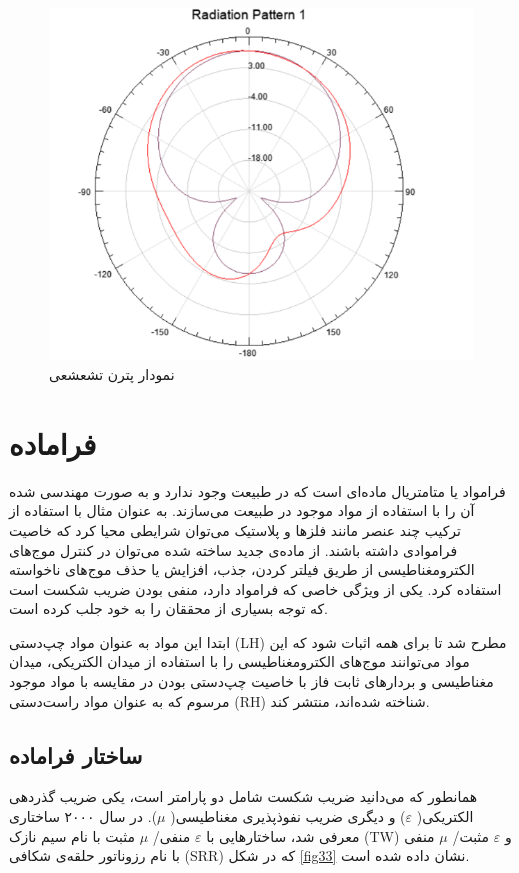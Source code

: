 \begin{figure}
	\centering
	\includegraphics[scale=0.5]{Images/fig32.png}
	\caption{نمودار پترن تشعشعی}
	\label{fig32}
\end{figure}
 
 
\section{فراماده}
 فرامواد یا متامتریال
  ماده‌ای است که در طبیعت وجود ندارد و به صورت مهندسی شده آن را با استفاده از مواد موجود در طبیعت می‌سازند. به عنوان مثال با استفاده از ترکیب چند عنصر مانند فلزها و پلاستیک می‌توان شرایطی محیا کرد که خاصیت فراموادی داشته باشند. از ماده‌ی جدید ساخته شده می‌توان در کنترل موج‌های الکترومغناطیسی از طریق فیلتر کردن، جذب، افزایش یا حذف موج‌های ناخواسته استفاده کرد. یکی از ویژگی خاصی که فرامواد دارد، منفی بودن ضریب شکست است که توجه بسیاری از محققان را به خود جلب کرده است. 
  
  
  ابتدا این مواد به عنوان مواد چپ‌دستی (LH) مطرح شد تا برای همه اثبات شود که این مواد می‌توانند موج‌های الکترومغناطیسی را با استفاده از میدان الکتریکی، میدان مغناطیسی و بردارهای ثابت فاز با خاصیت‌ چپ‌دستی بودن در مقایسه با مواد موجود مرسوم که به عنوان مواد راست‌دستی (RH) شناخته شده‌اند، منتشر کند.
  
  
\subsection{ساختار فراماده}
 
 همانطور که می‌دانید ضریب شکست شامل دو پارامتر است، یکی ضریب گذردهی الکتریکی(
 $\varepsilon$)
  و دیگری ضریب نفوذ‌پذیری مغناطیسی(
  $\mu$).
   در سال ۲۰۰۰ ساختاری معرفی شد، ساختارهایی با 
   $\varepsilon$
   منفی/ 
   $\mu$
   مثبت با نام سیم نازک (TW) و
   $\varepsilon$
    مثبت/
    $\mu$
     منفی با نام رزوناتور حلقه‌ی شکافی (SRR) که در شکل 
     \ref{fig33}
      نشان داده شده است.
 \cite{seee}
 
